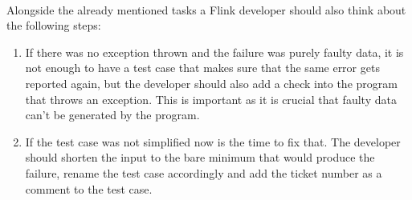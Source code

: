 \paragraph{} Alongside the already mentioned tasks a Flink developer should also think about the following steps:
\begin{enumerate}
  \item If there was no exception thrown and the failure was purely faulty data, it is not enough to have a test case that makes sure that the same error gets reported again, but the developer should also add a check into the program that throws an exception. This is important as it is crucial that faulty data can't be generated by the program.
  \item If the test case was not simplified now is the time to fix that. The developer should shorten the input to the bare minimum that would produce the failure, rename the test case accordingly and add the ticket number as a comment to the test case.
\end{enumerate}

